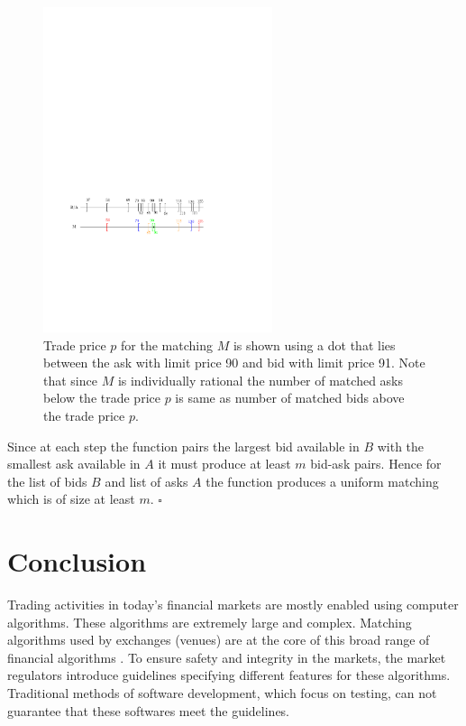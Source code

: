 \documentclass[a4paper,UKenglish,cleveref, autoref]{lipics-v2019}
\begin{document}
\begin{figure}[h!]
\centering
\includegraphics[width=0.6\textwidth]{UM_matching.pdf}
\caption{ Trade price $p$ for the matching $M$ is shown using a dot that lies between the ask with limit price 90 and bid with limit price 91. Note that since $M$ is individually rational the number of matched asks below the trade price $p$ is same as number of matched bids above the trade price $p$. }
\label{fig:UM_match}
\end{figure}

Since at each step the function   pairs the largest bid available in $B$ with the smallest ask available in $A$ it must produce  at least $m$ bid-ask pairs. Hence for the list of bids $B$ and list of asks $A$ the function  produces a uniform matching which is of size at least $m$. $\square$





\section{Conclusion}\label{sec:conclusion}
Trading activities in today's financial markets are mostly enabled using computer algorithms. These algorithms are extremely large and complex. Matching algorithms used by exchanges (venues) are at the core of this broad range of financial algorithms \cite{PassmoreI17}. To ensure safety and integrity in the markets, the market regulators introduce guidelines specifying different features for these algorithms. Traditional methods of software development, which focus on testing, can not guarantee that these softwares meet the guidelines. 
\end{document}
